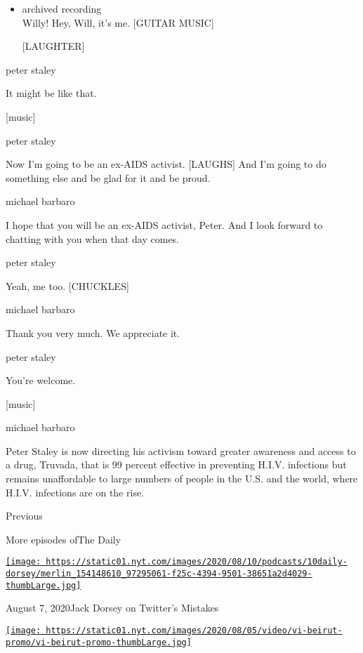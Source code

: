 \begin{itemize}
\item
  archived recording\\
  Willy! Hey, Will, it's me. {[}GUITAR MUSIC{]}

  {[}LAUGHTER{]}
\end{itemize}

peter staley

It might be like that.

{[}music{]}

peter staley

Now I'm going to be an ex-AIDS activist. {[}LAUGHS{]} And I'm going to
do something else and be glad for it and be proud.

michael barbaro

I hope that you will be an ex-AIDS activist, Peter. And I look forward
to chatting with you when that day comes.

peter staley

Yeah, me too. {[}CHUCKLES{]}

michael barbaro

Thank you very much. We appreciate it.

peter staley

You're welcome.

{[}music{]}

michael barbaro

Peter Staley is now directing his activism toward greater awareness and
access to a drug, Truvada, that is 99 percent effective in preventing
H.I.V. infections but remains unaffordable to large numbers of people in
the U.S. and the world, where H.I.V. infections are on the rise.

Previous

More episodes ofThe Daily

\href{https://www.nytimes.com/2020/08/07/podcasts/the-daily/Jack-dorsey-twitter-trump.html?action=click\&module=audio-series-bar\&region=header\&pgtype=Article}{\texttt{[image: https://static01.nyt.com/images/2020/08/10/podcasts/10daily-dorsey/merlin\_154148610\_97295061-f25c-4394-9501-38651a2d4029-thumbLarge.jpg]}}

August 7, 2020Jack Dorsey on Twitter's Mistakes

\href{https://www.nytimes.com/2020/08/06/podcasts/the-daily/beirut-explosion-damage.html?action=click\&module=audio-series-bar\&region=header\&pgtype=Article}{\texttt{[image: https://static01.nyt.com/images/2020/08/05/video/vi-beirut-promo/vi-beirut-promo-thumbLarge.jpg]}}

